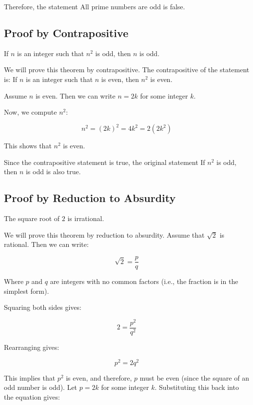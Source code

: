 Therefore, the statement All prime numbers are odd is false.
\QED

\subsection{Proof by Contrapositive}

If \( n \) is an integer such that \( n^2 \) is odd, then \( n \) is odd.
\vspace{\baselineskip}

We will prove this theorem by contrapositive. The contrapositive of the statement is: If \( n \) is an 
integer such that \( n \) is even, then \( n^2 \) is even.
\vspace{\baselineskip}

Assume \( n \) is even. Then we can write \( n = 2k \) for some integer \( k \).
\vspace{\baselineskip}

Now, we compute \( n^2 \):
	
\[
	n^2 = {(2k)}^2 = 4k^2 = 2(2k^2)
\]

This shows that \( n^2 \) is even.
\vspace{\baselineskip}

Since the contrapositive statement is true, the original statement If \( n^2 \) is odd, then \( n \) is 
odd is also true.

\QED

\subsection{Proof by Reduction to Absurdity}

The square root of \( 2 \) is irrational.
\vspace{\baselineskip}

We will prove this theorem by reduction to absurdity. Assume that \( \sqrt{2} \) is rational. Then we can 
write:

\[
	\sqrt{2} = \frac{p}{q}
\]

Where \( p \) and \( q \) are integers with no common factors (i.e., the fraction is in the simplest form).
\vspace{\baselineskip}

Squaring both sides gives:

\[
	2 = \frac{p^2}{q^2}
\]
	
Rearranging gives:

\[
	p^2 = 2q^2
\]
	
This implies that \( p^2 \) is even, and therefore, \( p \) must be even (since the square of an 
odd number is odd). Let \( p = 2k \) for some integer \( k \). Substituting this back into the 
equation gives:

